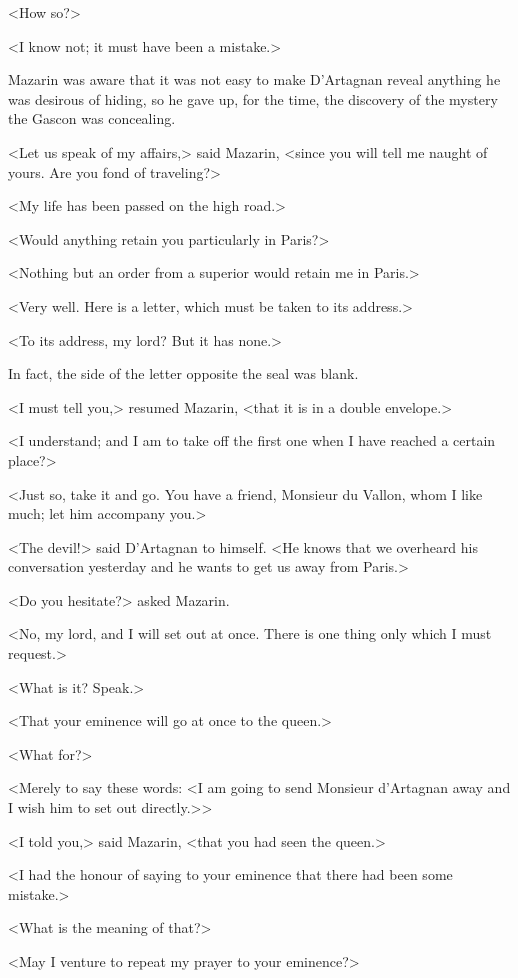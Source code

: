 <How so?>

<I know not; it must have been a mistake.>

Mazarin was aware that it was not easy to make D'Artagnan reveal anything he was desirous of hiding, so he gave up, for the time, the discovery of the mystery the Gascon was concealing.

<Let us speak of my affairs,> said Mazarin, <since you will tell me naught of yours. Are you fond of traveling?>

<My life has been passed on the high road.>

<Would anything retain you particularly in Paris?>

<Nothing but an order from a superior would retain me in Paris.>

<Very well. Here is a letter, which must be taken to its address.>

<To its address, my lord? But it has none.>

In fact, the side of the letter opposite the seal was blank.

<I must tell you,> resumed Mazarin, <that it is in a double envelope.>

<I understand; and I am to take off the first one when I have reached a certain place?>

<Just so, take it and go. You have a friend, Monsieur du Vallon, whom I like much; let him accompany you.>

<The devil!> said D'Artagnan to himself. <He knows that we overheard his conversation yesterday and he wants to get us away from Paris.>

<Do you hesitate?> asked Mazarin.

<No, my lord, and I will set out at once. There is one thing only which I must request.>

<What is it? Speak.>

<That your eminence will go at once to the queen.>

<What for?>

<Merely to say these words: <I am going to send Monsieur d'Artagnan away and I wish him to set out directly.>>

<I told you,> said Mazarin, <that you had seen the queen.>

<I had the honour of saying to your eminence that there had been some mistake.>

<What is the meaning of that?>

<May I venture to repeat my prayer to your eminence?>

